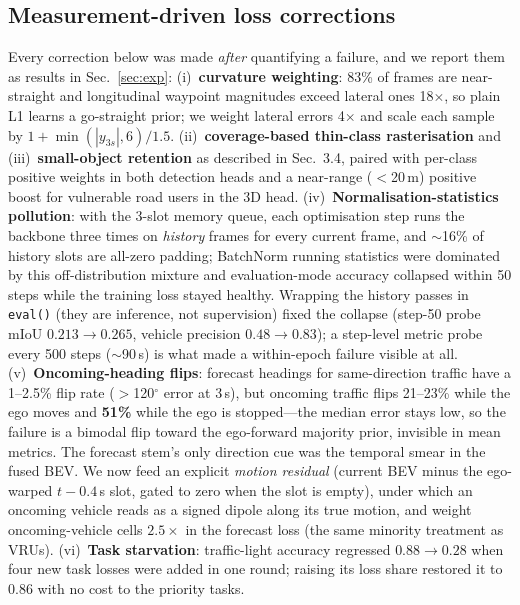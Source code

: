 \documentclass[10pt,twocolumn]{article}
\begin{document}
\subsection{Measurement-driven loss corrections}
\label{sec:fixes}
Every correction below was made \emph{after} quantifying a failure, and we
report them as results in Sec.~\ref{sec:exp}: (i)~\textbf{curvature
weighting}: 83\% of frames are near-straight and longitudinal waypoint
magnitudes exceed lateral ones 18$\times$, so plain L1 learns a go-straight
prior; we weight lateral errors 4$\times$ and scale each sample by
$1+\min(|y_{3s}|,6)/1.5$.
(ii)~\textbf{coverage-based thin-class rasterisation} and
(iii)~\textbf{small-object retention} as described in Sec.~3.4, paired with
per-class positive weights in both detection heads and a near-range
($<$20\,m) positive boost for vulnerable road users in the 3D head.
(iv)~\textbf{Normalisation-statistics pollution}: with the 3-slot memory
queue, each optimisation step runs the backbone three times on \emph{history}
frames for every current frame, and $\sim$16\% of history slots are all-zero
padding; BatchNorm running statistics were dominated by this off-distribution
mixture and evaluation-mode accuracy collapsed within 50 steps while the
training loss stayed healthy. Wrapping the history passes in
\texttt{eval()} (they are inference, not supervision) fixed the collapse
(step-50 probe mIoU $0.213\!\to\!0.265$, vehicle precision
$0.48\!\to\!0.83$); a step-level metric probe every 500 steps ($\sim$90\,s)
is what made a within-epoch failure visible at all.
(v)~\textbf{Oncoming-heading flips}: forecast headings for same-direction
traffic have a 1--2.5\% flip rate ($>$120$^\circ$ error at 3\,s), but
oncoming traffic flips 21--23\% while the ego moves and \textbf{51\%} while
the ego is stopped---the median error stays low, so the failure is a
bimodal flip toward the ego-forward majority prior, invisible in mean
metrics. The forecast stem's only direction cue was the temporal smear in
the fused BEV. We now feed an explicit \emph{motion residual} (current BEV
minus the ego-warped $t{-}0.4$\,s slot, gated to zero when the slot is
empty), under which an oncoming vehicle reads as a signed dipole along its
true motion, and weight oncoming-vehicle cells $2.5\times$ in the forecast
loss (the same minority treatment as VRUs).
(vi)~\textbf{Task starvation}: traffic-light accuracy regressed
$0.88\!\to\!0.28$ when four new task losses were added in one round; raising
its loss share restored it to $0.86$ with no cost to the priority tasks.
\end{document}
